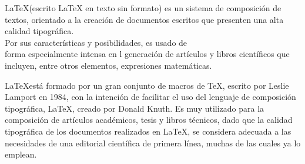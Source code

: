 \documentclass{book}
\begin{document}
\LaTeX (escrito LaTeX en texto sin formato) es un sistema de composición de textos, orientado a la
creación de documentos      escritos que presenten una alta calidad tipográfica. \\ Por sus características y posibilidades, es usado de \\[5pt] forma especialmente intensa en l generación de artículos y libros científicos que incluyen, entre otros elementos, expresiones matemáticas. 

\LaTeX está formado por un gran conjunto de macros de TeX, escrito por Leslie Lamport en 1984, con la intención de facilitar el uso del lenguaje de composición tipográfica, \LaTeX, creado por Donald Knuth. Es muy utilizado para la composición de artículos académicos, tesis y libros técnicos, dado que la calidad tipográfica de los documentos realizados en LaTeX, se considera adecuada a las necesidades de una editorial científica de primera línea, muchas de las cuales ya lo emplean.
\end{document}
